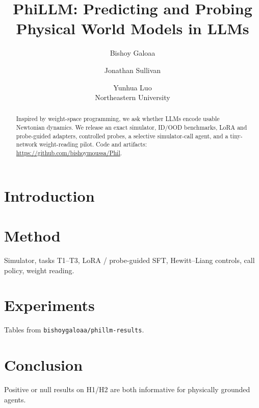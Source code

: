 \documentclass{article}
\title{PhiLLM: Predicting and Probing Physical World Models in LLMs}
\author{Bishoy Galoaa \and Jonathan Sullivan \and Yunhua Luo \\ Northeastern University}
\begin{document}
\maketitle
\begin{abstract}
Inspired by weight-space programming, we ask whether LLMs encode usable Newtonian dynamics.
We release an exact simulator, ID/OOD benchmarks, LoRA and probe-guided adapters, controlled probes, a selective simulator-call agent, and a tiny-network weight-reading pilot.
Code and artifacts: \url{https://github.com/bishoymoussa/Phil}.
\end{abstract}

\section{Introduction}

\section{Method}
Simulator, tasks T1--T3, LoRA / probe-guided SFT, Hewitt--Liang controls, call policy, weight reading.

\section{Experiments}
Tables from \texttt{bishoygaloaa/phillm-results}.

\section{Conclusion}
Positive or null results on H1/H2 are both informative for physically grounded agents.
\end{document}
